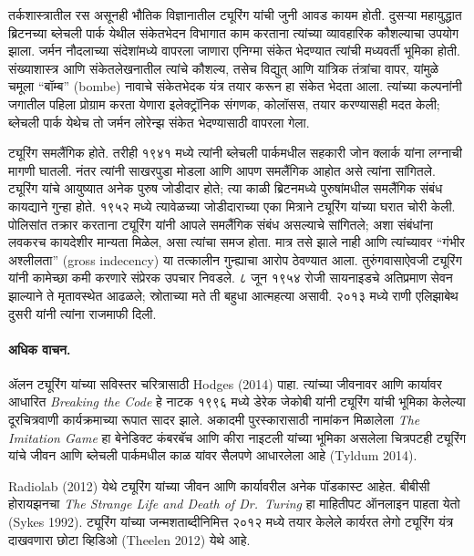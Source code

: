 तर्कशास्त्रातील रस असूनही भौतिक विज्ञानातील ट्यूरिंग यांची जुनी आवड कायम होती. दुसऱ्या महायुद्धात ब्रिटनच्या ब्लेचली पार्क येथील संकेतभेदन विभागात काम करताना त्यांच्या व्यावहारिक कौशल्याचा उपयोग झाला. जर्मन नौदलाच्या संदेशांमध्ये वापरला जाणारा एनिग्मा संकेत भेदण्यात त्यांची मध्यवर्ती भूमिका होती. संख्याशास्त्र आणि संकेतलेखनातील त्यांचे कौशल्य, तसेच विद्युत् आणि यांत्रिक तंत्रांचा वापर, यांमुळे चमूला “बॉम्ब” (bombe) नावाचे संकेतभेदक यंत्र तयार करून हा संकेत भेदता आला. त्यांच्या कल्पनांनी जगातील पहिला प्रोग्राम करता येणारा इलेक्ट्रॉनिक संगणक, कोलॉसस, तयार करण्यासही मदत केली; ब्लेचली पार्क येथेच तो जर्मन लोरेन्झ संकेत भेदण्यासाठी वापरला गेला.

ट्यूरिंग समलैंगिक होते. तरीही १९४१ मध्ये त्यांनी ब्लेचली पार्कमधील सहकारी जोन क्लार्क यांना लग्नाची मागणी घातली. नंतर त्यांनी साखरपुडा मोडला आणि आपण समलैंगिक आहोत असे त्यांना सांगितले. ट्यूरिंग यांचे आयुष्यात अनेक पुरुष जोडीदार होते; त्या काळी ब्रिटनमध्ये पुरुषांमधील समलैंगिक संबंध कायद्याने गुन्हा होते. १९५२ मध्ये त्यावेळच्या जोडीदाराच्या एका मित्राने ट्यूरिंग यांच्या घरात चोरी केली. पोलिसांत तक्रार करताना ट्यूरिंग यांनी आपले समलैंगिक संबंध असल्याचे सांगितले; अशा संबंधांना लवकरच कायदेशीर मान्यता मिळेल, असा त्यांचा समज होता. मात्र तसे झाले नाही आणि त्यांच्यावर “गंभीर अश्लीलता” (gross indecency) या तत्कालीन गुन्ह्याचा आरोप ठेवण्यात आला. तुरुंगवासाऐवजी ट्यूरिंग यांनी कामेच्छा कमी करणारे संप्रेरक उपचार निवडले. ८ जून १९५४ रोजी सायनाइडचे अतिप्रमाण सेवन झाल्याने ते मृतावस्थेत आढळले; स्रोताच्या मते ती बहुधा आत्महत्या असावी. २०१३ मध्ये राणी एलिझाबेथ दुसरी यांनी त्यांना राजमाफी दिली.

\paragraph{अधिक वाचन.}
ॲलन ट्यूरिंग यांच्या सविस्तर चरित्रासाठी Hodges (2014) पाहा. त्यांच्या जीवनावर आणि कार्यावर आधारित \emph{Breaking the Code} हे नाटक १९९६ मध्ये डेरेक जेकोबी यांनी ट्यूरिंग यांची भूमिका केलेल्या दूरचित्रवाणी कार्यक्रमाच्या रूपात सादर झाले. अकादमी पुरस्कारासाठी नामांकन मिळालेला \emph{The Imitation Game} हा बेनेडिक्ट कंबरबॅच आणि कीरा नाइटली यांच्या भूमिका असलेला चित्रपटही ट्यूरिंग यांचे जीवन आणि ब्लेचली पार्कमधील काळ यांवर सैलपणे आधारलेला आहे (Tyldum 2014).

Radiolab (2012) येथे ट्यूरिंग यांच्या जीवन आणि कार्यावरील अनेक पॉडकास्ट आहेत. बीबीसी होरायझनचा \emph{The Strange Life and Death of
  Dr.~Turing} हा माहितीपट ऑनलाइन पाहता येतो (Sykes 1992). ट्यूरिंग यांच्या जन्मशताब्दीनिमित्त २०१२ मध्ये तयार केलेले कार्यरत लेगो ट्यूरिंग यंत्र दाखवणारा छोटा व्हिडिओ (Theelen 2012) येथे आहे.

